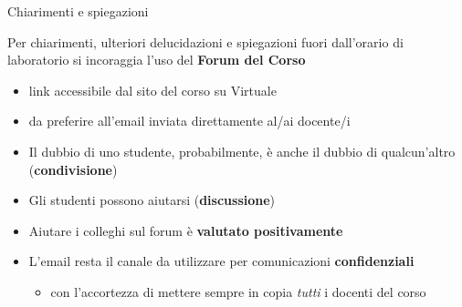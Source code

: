 \documentclass[xcolor=dvipsnames,presentation]{beamer}
\begin{document}
\begin{frame}{Chiarimenti e spiegazioni}

Per chiarimenti, ulteriori delucidazioni e spiegazioni fuori dall'orario di laboratorio
si incoraggia l'uso del \textbf{Forum del Corso}
\begin{itemize}
    \item link accessibile dal sito del corso su Virtuale
    \item da preferire all'email inviata direttamente al/ai docente/i
\end{itemize}

\begin{block}{}
    \begin{itemize}
        \item Il dubbio di uno studente, probabilmente, è anche il dubbio di qualcun'altro (\textbf{condivisione})
        \item Gli studenti possono aiutarsi (\textbf{discussione})
        \item Aiutare i colleghi sul forum è \textbf{valutato positivamente}
    \end{itemize}
\end{block}
\vfill
\begin{itemize}
\item L'email resta il canale da utilizzare per comunicazioni \textbf{confidenziali}
    \begin{itemize}
        \item con l'accortezza di mettere sempre in copia \emph{tutti} i docenti del corso
    \end{itemize}
\end{itemize}



\end{frame}
\end{document}

